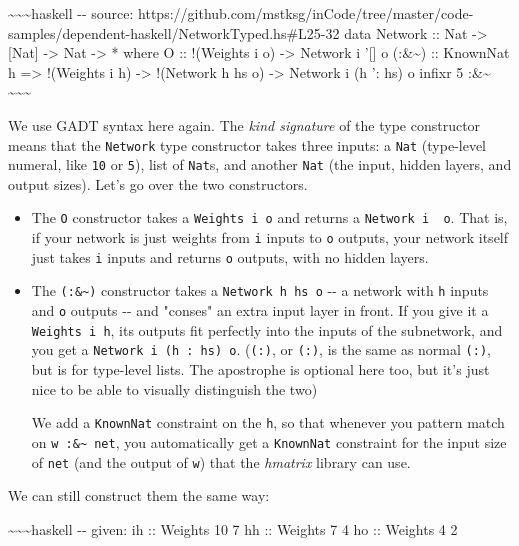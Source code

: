 \documentclass[]{article}
\begin{document}
\textasciitilde{}\textasciitilde{}\textasciitilde{}haskell -\/- source:
https://github.com/mstksg/inCode/tree/master/code-samples/dependent-haskell/NetworkTyped.hs\#L25-32
data Network :: Nat -\textgreater{} {[}Nat{]} -\textgreater{} Nat
-\textgreater{} * where O :: !(Weights i o) -\textgreater{} Network i '{[}{]} o
(:\&\textasciitilde{}) :: KnownNat h =\textgreater{} !(Weights i h)
-\textgreater{} !(Network h hs o) -\textgreater{} Network i (h ': hs) o infixr 5
:\&\textasciitilde{} \textasciitilde{}\textasciitilde{}\textasciitilde{}

We use GADT syntax here again. The \emph{kind signature} of the type constructor
means that the \texttt{Network} type constructor takes three inputs: a
\texttt{Nat} (type-level numeral, like \texttt{10} or \texttt{5}), list of
\texttt{Nat}s, and another \texttt{Nat} (the input, hidden layers, and output
sizes). Let's go over the two constructors.

\begin{itemize}
\item
  The \texttt{O} constructor takes a \texttt{Weights\ i\ o} and returns a
  \texttt{Network\ i\ \textquotesingle{}{[}{]}\ o}. That is, if your network is
  just weights from \texttt{i} inputs to \texttt{o} outputs, your network itself
  just takes \texttt{i} inputs and returns \texttt{o} outputs, with no hidden
  layers.
\item
  The \texttt{(:\&\textasciitilde{})} constructor takes a
  \texttt{Network\ h\ hs\ o} -\/- a network with \texttt{h} inputs and
  \texttt{o} outputs -\/- and "conses" an extra input layer in front. If you
  give it a \texttt{Weights\ i\ h}, its outputs fit perfectly into the inputs of
  the subnetwork, and you get a
  \texttt{Network\ i\ (h\ \textquotesingle{}:\ hs)\ o}.
  (\texttt{(\textquotesingle{}:)}, or \texttt{(:)}, is the same as normal
  \texttt{(:)}, but is for type-level lists. The apostrophe is optional here
  too, but it's just nice to be able to visually distinguish the two)

  We add a \texttt{KnownNat} constraint on the \texttt{h}, so that whenever you
  pattern match on \texttt{w\ :\&\textasciitilde{}\ net}, you automatically get
  a \texttt{KnownNat} constraint for the input size of \texttt{net} (and the
  output of \texttt{w}) that the \emph{hmatrix} library can use.
\end{itemize}

We can still construct them the same way:

\textasciitilde{}\textasciitilde{}\textasciitilde{}haskell -\/- given: ih ::
Weights 10 7 hh :: Weights 7 4 ho :: Weights 4 2
\end{document}
